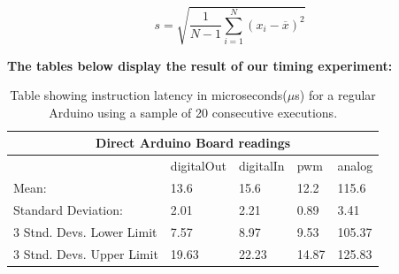 $$
s = \sqrt{\frac{1}{N-1} \sum_{i=1}^N (x_i - \overline{x})^2}
$$
\label{eq:sd}

\newpage
\textbf{The tables below display the result of our timing experiment: }

\begin{table}[h!]
	\caption{Table showing instruction latency in microseconds($\mu$s) for a regular Arduino using a sample of 20 consecutive executions.}\label{table:arduinoboard}
	\begin{tabular}{|l|l|l|l|l|}
	\toprule
 \multicolumn{5}{c}{\textbf{Direct Arduino Board readings}} \\\hline

& digitalOut & digitalIn & pwm & analog \\\hline
Mean:                   & 13.6 & 15.6 & 12.2 & 115.6\\\hline
Standard Deviation:     & 2.01 & 2.21  & 0.89  & 3.41 \\\hline
3 Stnd. Devs. Lower Limit& 7.57 & 8.97  & 9.53  & 105.37 \\\hline
3 Stnd. Devs. Upper Limit& 19.63& 22.23 & 14.87 & 125.83 \\\hline
\end{tabular}
\end{table}

